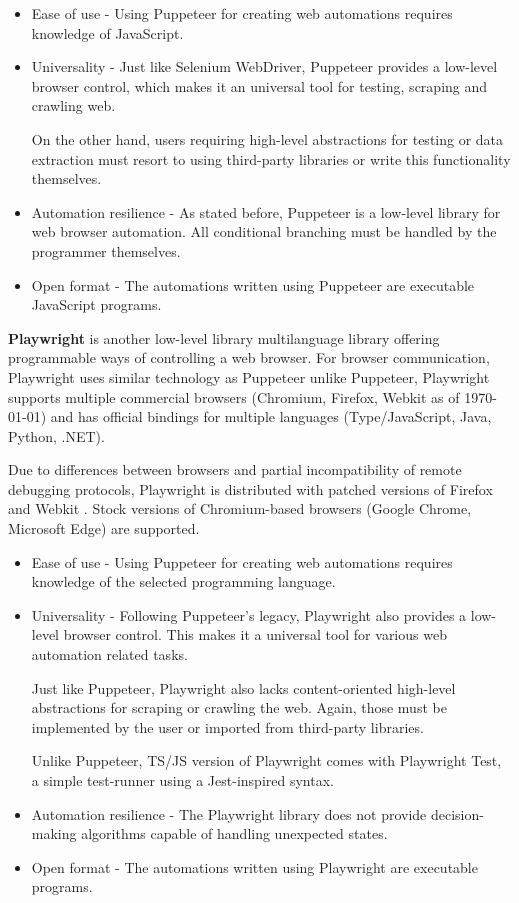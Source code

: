 \begin{itemize}
    \item Ease of use - Using Puppeteer for creating web automations requires knowledge of JavaScript.

    \item Universality - Just like Selenium WebDriver, Puppeteer provides a low-level browser control, which makes it an universal tool for testing, scraping and crawling web. 
    
    On the other hand, users requiring high-level abstractions for testing or data extraction must resort to using third-party libraries or write this functionality themselves.

    \item Automation resilience -
    As stated before, Puppeteer is a low-level library for web browser automation. All conditional branching must be handled by the programmer themselves.
    \item Open format - The automations written using Puppeteer are executable JavaScript programs.
\end{itemize}

\textbf{Playwright} is another low-level library multilanguage library offering programmable ways of controlling a web browser.
For browser communication, Playwright uses similar technology as Puppeteer\; unlike Puppeteer, Playwright supports multiple commercial browsers (Chromium, Firefox, Webkit as of \today) and has official bindings for multiple languages (Type/JavaScript, Java, Python, .NET).

Due to differences between browsers and partial incompatibility of remote debugging protocols, Playwright is distributed with patched versions of Firefox and Webkit .
Stock versions of Chromium-based browsers (Google Chrome, Microsoft Edge) are supported. 


\begin{itemize}
    \item Ease of use - Using Puppeteer for creating web automations requires knowledge of the selected programming language.

    \item Universality - Following Puppeteer's legacy, Playwright also provides a low-level browser control. This makes it a universal tool for various web automation related tasks.
    
    Just like Puppeteer, Playwright also lacks content-oriented high-level abstractions for scraping or crawling the web. Again, those must be implemented by the user or imported from third-party libraries.
    
    Unlike Puppeteer, TS/JS version of Playwright comes with Playwright Test, a simple test-runner using a Jest-inspired syntax.

    \item Automation resilience -
    The Playwright library does not provide decision-making algorithms capable of handling unexpected states.

    \item Open format - The automations written using Playwright are executable programs.
\end{itemize}


